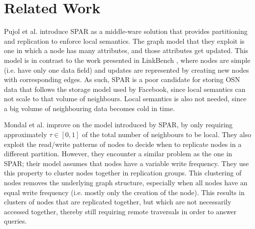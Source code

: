 \section{Related Work}

Pujol et al. introduce SPAR \cite{Pujol12} as a middle-ware solution that
provides partitioning and replication to enforce local semantics. The graph
model that they exploit is one in which a node has many attributes, and those
attributes get updated. This model is in contrast to the work presented in
LinkBench \cite{Armstrong13}, where nodes are simple (i.e. have only one data
field) and updates are represented by creating new nodes with corresponding
edges. As such, SPAR is a poor candidate for storing OSN data that follows the
storage model used by Facebook, since local semantics can not scale to that
volume of neighbours. Local semantics is also not needed, since a big volume of
neighbouring data becomes cold in time.

Mondal et al. \cite{Mondal12} improve on the model introduced by SPAR, by only
requiring approximately $\tau \in [0, 1]$ of the total number of neighbours to
be local. They also exploit the read/write patterns of nodes to decide when to
replicate nodes in a different partition. However, they encounter a similar
problem as the one in SPAR; their model assumes that nodes have a variable write
frequency. They use this property to cluster nodes together in replication
groups. This clustering of nodes removes the underlying graph structure,
especially when all nodes have an equal write frequency (i.e. mostly only the
creation of the node). This results in clusters of nodes that are replicated
together, but which are not necessarily accessed together, thereby still
requiring remote traversals in order to answer queries.
